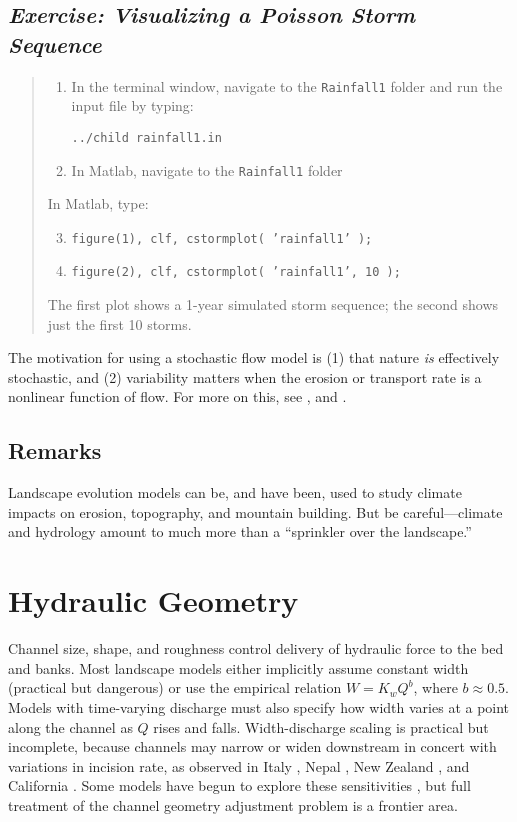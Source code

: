 \documentclass[12pt,reqno]{amsart}
\begin{document}
\subsection*{\em Exercise: Visualizing a Poisson Storm Sequence}

\begin{quote}
\small
{\sf
\begin{enumerate}
\item
In the terminal window, navigate to the {\tt Rainfall1} folder and run the input file by typing:

{\tt ../child rainfall1.in}
\item
In Matlab, navigate to the {\tt Rainfall1} folder
\end{enumerate}
In Matlab, type:
\begin{enumerate}
\setcounter{enumi}{2}
\item
{\tt figure(1), clf, cstormplot( 'rainfall1' );}
\item
{\tt figure(2), clf, cstormplot( 'rainfall1', 10 );}
\end{enumerate}
The first plot shows a 1-year simulated storm sequence; the second
shows just the first 10 storms.
}
\end{quote}

The motivation for using a stochastic flow model is (1) that nature
{\em is} effectively stochastic, and (2) variability matters when the
erosion or transport rate is a nonlinear function of flow. For more on
this, see
\citet{tucker2000stochastic,snyder2003importance,tucker2004drainage},
and \citet{dibiase2011thresh}.

\subsection{Remarks}

Landscape evolution models can be, and have been, used to study climate impacts on erosion, topography, and mountain building. But be careful---climate and hydrology amount to much more than a ``sprinkler over the landscape.''

\section{Hydraulic Geometry}

Channel size, shape, and roughness control delivery of hydraulic force
to the bed and banks. Most landscape models either implicitly assume
constant width (practical but dangerous) or use the empirical relation
$W = K_w Q^b$, where $b\approx 0.5$. Models with time-varying
discharge must also specify how width varies at a point along the
channel as $Q$ rises and falls. Width-discharge scaling is practical
but incomplete, because channels may narrow or widen downstream in
concert with variations in incision rate, as observed in Italy
\citep{whittaker2007a}, Nepal \citep{LaveAvouac2001}, New Zealand
\citep{AmosBurbank2007}, and California \citep{Duvall2004}. Some
models have begun to explore these sensitivities \citep{wobus2006self,attal2008modeling,turowski2009},
but full treatment of the channel geometry adjustment problem is a frontier area.
\end{document}
